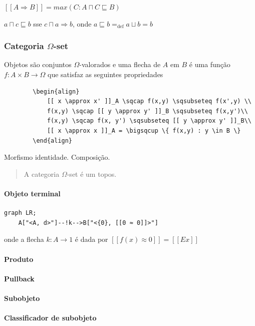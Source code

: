 \([[ A \Rightarrow B ]] = max (C : A \sqcap C \sqsubseteq B)\)

\(a \sqcap c \sqsubseteq b\) sse \(c \sqcap a \Rightarrow b\), onde
\(a \sqsubseteq b =_{\text{def}} a \sqcup b = b\)

\hypertarget{categoria-omega-set}{%
\subsubsection{\texorpdfstring{Categoria
\(\Omega\)-set}{Categoria \textbackslash Omega-set}}\label{categoria-omega-set}}

Objetos são conjuntos \(\Omega\)-valorados e uma flecha de \(A\) em
\(B\) é uma função \(f : A \times B \rightarrow \Omega\) que satisfaz as
seguintes propriedades

\begin{verbatim}
        \begin{align}
            [[ x \approx x' ]]_A \sqcap f(x,y) \sqsubseteq f(x',y) \\
            f(x,y) \sqcap [[ y \approx y' ]]_B \sqsubseteq f(x,y')\\
            f(x,y) \sqcap f(x, y') \sqsubseteq [[ y \approx y' ]]_B\\
            [[ x \approx x ]]_A = \bigsqcup \{ f(x,y) : y \in B \}
        \end{align}
\end{verbatim}

Morfismo identidade. Composição.

\begin{quote}
A categoria \(\Omega\)-set é um topos.
\end{quote}

\hypertarget{objeto-terminal-1}{%
\paragraph{Objeto terminal}\label{objeto-terminal-1}}

\begin{verbatim}
graph LR;
    A["<A, d>"]--!k-->B["<{0}, [[0 ≈ 0]]>"]
\end{verbatim}

onde a flecha \(k : A \rightarrow 1\) é dada por
\([[f(x) \approx 0]] = [[Ex]]\)

\hypertarget{produto}{%
\paragraph{Produto}\label{produto}}

\hypertarget{pullback-1}{%
\paragraph{Pullback}\label{pullback-1}}

\hypertarget{subobjeto-1}{%
\paragraph{Subobjeto}\label{subobjeto-1}}

\hypertarget{classificador-de-subobjeto}{%
\paragraph{Classificador de
subobjeto}\label{classificador-de-subobjeto}}
